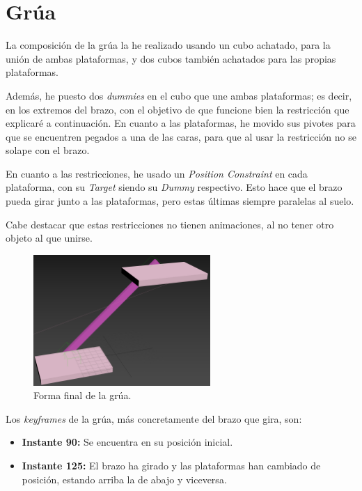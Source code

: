\newpage

\section{Grúa}

La composición de la grúa la he realizado usando un cubo achatado, para la unión de ambas plataformas, y dos cubos también achatados para las propias plataformas.

\bigskip

Además, he puesto dos \textit{dummies} en el cubo que une ambas plataformas; es decir, en los extremos del brazo, con el objetivo de que funcione bien la restricción que explicaré a continuación. En cuanto a las plataformas, he movido sus pivotes para que se encuentren pegados a una de las caras, para que al usar la restricción no se solape con el brazo.

\bigskip

En cuanto a las restricciones, he usado un \textit{Position Constraint} en cada plataforma, con su \textit{Target} siendo su \textit{Dummy} respectivo. Esto hace que el brazo pueda girar junto a las plataformas, pero estas últimas siempre paralelas al suelo.

\bigskip

Cabe destacar que estas restricciones no tienen animaciones, al no tener otro objeto al que unirse.

\begin{figure}[H]
    \centering
    \includegraphics[width=0.6\textwidth]{imagenes/grua/grua.png}
    \caption{Forma final de la grúa.}
 \end{figure}

Los \textit{keyframes} de la grúa, más concretamente del brazo que gira, son:

\begin{itemize}
    \item \textbf{Instante 90: }Se encuentra en su posición inicial.
    \item \textbf{Instante 125: }El brazo ha girado y las plataformas han cambiado de posición, estando arriba la de abajo y viceversa.
\end{itemize}

